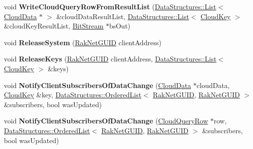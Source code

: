 \begin{DoxyCompactItemize}
\item 
\hypertarget{class_rak_net_1_1_cloud_server_affdd5a10414913d7b76fbb388ba11892}{void {\bfseries Write\-Cloud\-Query\-Row\-From\-Result\-List} (\hyperlink{class_data_structures_1_1_list}{Data\-Structures\-::\-List}$<$ \hyperlink{struct_rak_net_1_1_cloud_server_1_1_cloud_data}{Cloud\-Data} $\ast$ $>$ \&cloud\-Data\-Result\-List, \hyperlink{class_data_structures_1_1_list}{Data\-Structures\-::\-List}$<$ \hyperlink{struct_rak_net_1_1_cloud_key}{Cloud\-Key} $>$ \&cloud\-Key\-Result\-List, \hyperlink{class_rak_net_1_1_bit_stream}{Bit\-Stream} $\ast$bs\-Out)}\label{class_rak_net_1_1_cloud_server_affdd5a10414913d7b76fbb388ba11892}

\item 
\hypertarget{class_rak_net_1_1_cloud_server_ac1c9a4290b811f3016784393bd327599}{void {\bfseries Release\-System} (\hyperlink{struct_rak_net_1_1_rak_net_g_u_i_d}{Rak\-Net\-G\-U\-I\-D} client\-Address)}\label{class_rak_net_1_1_cloud_server_ac1c9a4290b811f3016784393bd327599}

\item 
\hypertarget{class_rak_net_1_1_cloud_server_abc615c4b21b2f4500d9279d56d47d365}{void {\bfseries Release\-Keys} (\hyperlink{struct_rak_net_1_1_rak_net_g_u_i_d}{Rak\-Net\-G\-U\-I\-D} client\-Address, \hyperlink{class_data_structures_1_1_list}{Data\-Structures\-::\-List}$<$ \hyperlink{struct_rak_net_1_1_cloud_key}{Cloud\-Key} $>$ \&keys)}\label{class_rak_net_1_1_cloud_server_abc615c4b21b2f4500d9279d56d47d365}

\item 
\hypertarget{class_rak_net_1_1_cloud_server_a6e91a8c2e7941186f9b6811b7176edde}{void {\bfseries Notify\-Client\-Subscribers\-Of\-Data\-Change} (\hyperlink{struct_rak_net_1_1_cloud_server_1_1_cloud_data}{Cloud\-Data} $\ast$cloud\-Data, \hyperlink{struct_rak_net_1_1_cloud_key}{Cloud\-Key} \&key, \hyperlink{class_data_structures_1_1_ordered_list}{Data\-Structures\-::\-Ordered\-List}$<$ \hyperlink{struct_rak_net_1_1_rak_net_g_u_i_d}{Rak\-Net\-G\-U\-I\-D}, \hyperlink{struct_rak_net_1_1_rak_net_g_u_i_d}{Rak\-Net\-G\-U\-I\-D} $>$ \&subscribers, bool was\-Updated)}\label{class_rak_net_1_1_cloud_server_a6e91a8c2e7941186f9b6811b7176edde}

\item 
\hypertarget{class_rak_net_1_1_cloud_server_a03ba99daf7424bb6d97d4f4d9dc38891}{void {\bfseries Notify\-Client\-Subscribers\-Of\-Data\-Change} (\hyperlink{struct_rak_net_1_1_cloud_query_row}{Cloud\-Query\-Row} $\ast$row, \hyperlink{class_data_structures_1_1_ordered_list}{Data\-Structures\-::\-Ordered\-List}$<$ \hyperlink{struct_rak_net_1_1_rak_net_g_u_i_d}{Rak\-Net\-G\-U\-I\-D}, \hyperlink{struct_rak_net_1_1_rak_net_g_u_i_d}{Rak\-Net\-G\-U\-I\-D} $>$ \&subscribers, bool was\-Updated)}\label{class_rak_net_1_1_cloud_server_a03ba99daf7424bb6d97d4f4d9dc38891}


\end{DoxyCompactItemize}
